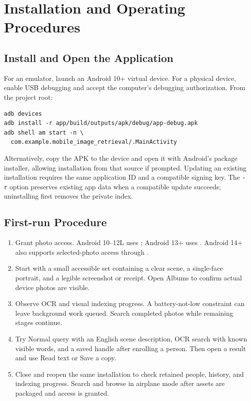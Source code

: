 \documentclass[11pt,a4paper]{article}
\newcommand{\code}[1]{{\small\texttt{#1}}}
\newcommand{\reportsection}[1]{\section{#1}}
\begin{document}
\reportsection{Installation and Operating Procedures}

\subsection{Install and Open the Application}
For an emulator, launch an Android 10+ virtual device. For a physical device, enable USB debugging and accept the computer's debugging authorization. From the project root:
\begin{verbatim}
adb devices
adb install -r app/build/outputs/apk/debug/app-debug.apk
adb shell am start -n \
  com.example.mobile_image_retrieval/.MainActivity
\end{verbatim}
Alternatively, copy the APK to the device and open it with Android's package installer, allowing installation from that source if prompted. Updating an existing installation requires the same application ID and a compatible signing key. The \code{-r} option preserves existing app data when a compatible update succeeds; uninstalling first removes the private index.

\subsection{First-run Procedure}
\begin{enumerate}
\item Grant photo access. Android 10--12L uses ; Android 13+ uses . Android 14+ also supports selected-photo access through .
\item Start with a small accessible set containing a clear scene, a single-face portrait, and a legible screenshot or receipt. Open Albums to confirm actual device photos are visible.
\item Observe OCR and visual indexing progress. A battery-not-low constraint can leave background work queued. Search completed photos while remaining stages continue.
\item Try Normal query with an English scene description, OCR search with known visible words, and a saved handle after enrolling a person. Then open a result and use Read text or Save a copy.
\item Close and reopen the same installation to check retained people, history, and indexing progress. Search and browse in airplane mode after assets are packaged and access is granted.
\end{enumerate}
\end{document}
